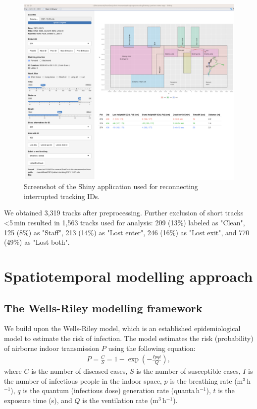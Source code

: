 \documentclass[fleqn,11pt]{wlscirep_supp}
\begin{document}
\begin{figure}[!htpb]
    \centering
    \includegraphics[width=\linewidth]{doc/paper/shiny-tool-screenshot.png}
    \caption{Screenshot of the Shiny application used for reconnecting interrupted tracking IDs.}
    \label{fig:shiny-app}
\end{figure}

We obtained 3,319 tracks after preprocessing. Further exclusion of short tracks <5\,min resulted in 1,563 tracks used for analysis: 209 (13\%) labeled as "Clean", 125 (8\%) as "Staff", 213 (14\%) as "Lost enter", 246 (16\%) as "Lost exit", and 770 (49\%) as "Lost both". 

\clearpage

\section{Spatiotemporal modelling approach}\label{sec:spattemp-model}

\subsection{The Wells-Riley modelling framework}

We build upon the Wells-Riley model\cite{Riley1961Book}, which is an established epidemiological model to estimate the risk of infection. The model estimates the risk (probability) of airborne indoor transmission $P$ using the following equation: 
\begin{align}
    P = \frac{C}{S} = 1 - \exp \left(-\frac{Ipqt}{Q}\right),
\end{align}
where $C$ is the number of diseased cases, $S$ is the number of susceptible cases, $I$ is the number of infectious people in the indoor space, $p$ is the breathing rate (m$^3$\,h$^{-1}$), $q$ is the quantum (infectious dose) generation rate (quanta\,h$^{-1}$), $t$ is the exposure time (s), and $Q$ is the ventilation rate (m$^3$\,h$^{-1}$).
\end{document}
